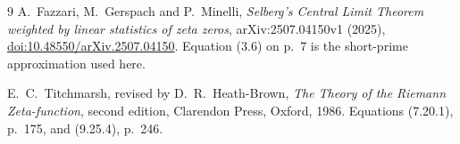 \documentclass[11pt]{article}
\numberwithin{equation}{section}
\theoremstyle{remark}
\begin{document}
\begin{thebibliography}{9}
A.~Fazzari, M.~Gerspach and P.~Minelli,
\emph{Selberg's Central Limit Theorem weighted by linear statistics of
zeta zeros}, arXiv:2507.04150v1 (2025),
\href{https://doi.org/10.48550/arXiv.2507.04150}
{doi:10.48550/arXiv.2507.04150}.
Equation (3.6) on p.~7 is the short-prime approximation used here.

E.~C.~Titchmarsh, revised by D.~R.~Heath-Brown,
\emph{The Theory of the Riemann Zeta-function}, second edition,
Clarendon Press, Oxford, 1986.
Equations (7.20.1), p.~175, and (9.25.4), p.~246.

\end{thebibliography}
\end{document}
